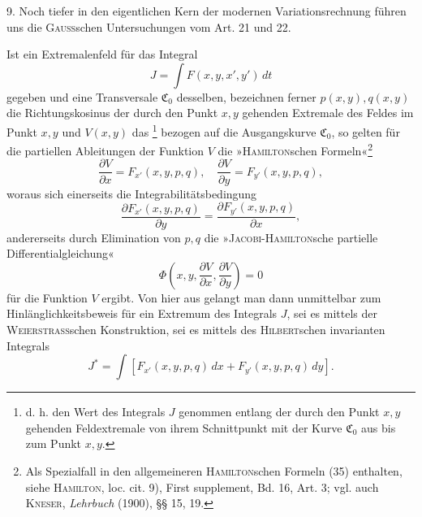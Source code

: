 \clearpage\begingroup\NoSourceHead{}
\renewcommand{\thefootnote}{\arabic{footnote})}\setcounter{footnote}{11}
\begin{center}\end{center}
\noindent\hspace*{\parindent}9. Noch tiefer in den eigentlichen Kern der modernen Variationsrechnung
führen uns die \textsc{Gauss}schen Untersuchungen vom Art. 21 und 22.

Ist ein Extremalenfeld für das Integral
\begin{equation*}\tag{8}
J=\int F(x,y,x',y')\,dt
\end{equation*}
gegeben und eine Transversale $\mathfrak C_0$ desselben, bezeichnen ferner $p(x,y),q(x,y)$
die Richtungskosinus der durch den Punkt $x,y$ gehenden Extremale des Feldes
im Punkt $x,y$ und $V(x,y)$ das \footnote{d. h. den Wert des Integrals $J$ genommen entlang der durch den Punkt $x,y$ gehenden Feldextremale
von ihrem Schnittpunkt mit der Kurve $\mathfrak C_0$ aus bis zum Punkt $x,y$.} bezogen auf die Ausgangskurve
$\mathfrak C_0$, so gelten für die partiellen Ableitungen der Funktion $V$ die »\textsc{Hamilton}schen Formeln«\footnote{Als Spezialfall in den allgemeineren \textsc{Hamilton}schen Formeln (35) enthalten, siehe \textsc{Hamilton},
loc. cit. 9), First supplement, Bd. 16, Art. 3; vgl. auch \textsc{Kneser}, \textit{Lehrbuch} (1900), §§ 15, 19.}
\begin{equation*}\tag{24}
\frac{\partial V}{\partial x}=F_{x'}(x,y,p,q),\quad\frac{\partial V}{\partial y}=F_{y'}(x,y,p,q),
\end{equation*}
woraus sich einerseits die Integrabilitätsbedingung
\begin{equation*}\tag{25}
\frac{\partial F_{x'}(x,y,p,q)}{\partial y}=\frac{\partial F_{y'}(x,y,p,q)}{\partial x},
\end{equation*}
andererseits durch Elimination von $p,q$ die »\textsc{Jacobi-Hamilton}sche partielle
Differentialgleichung«
\begin{equation*}\tag{26}
\Phi\left(x,y,\frac{\partial V}{\partial x},\frac{\partial V}{\partial y}\right)=0
\end{equation*}
für die Funktion $V$ ergibt. Von hier aus gelangt man dann unmittelbar zum
\clearpage{}
\noindent Hinlänglichkeitsbeweis für ein Extremum des Integrals $J$, sei es mittels der
\textsc{Weierstrass}schen Konstruktion, sei es mittels des \textsc{Hilbert}schen invarianten
Integrals
\begin{equation*}\tag{27}
J^*=\int[F_{x'}(x,y,p,q)\,dx+F_{y'}(x,y,p,q)\,dy].
\end{equation*}

